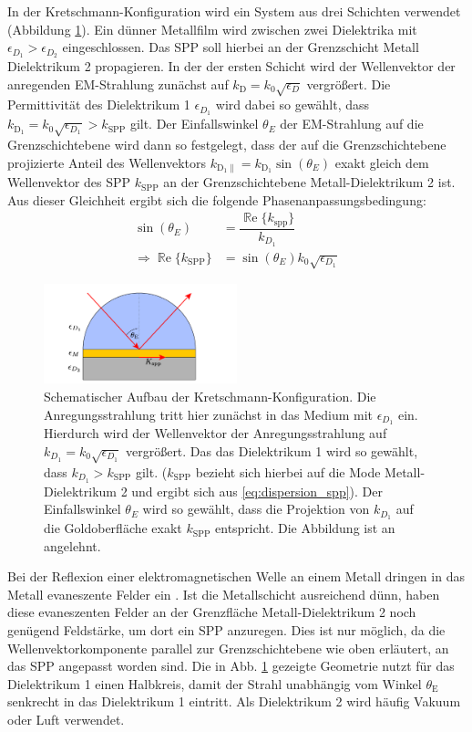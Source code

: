 \documentclass[titlepage,  ngerman]{article}
\renewcommand{\Re}{\operatorname{\mathbb{R}e}}
\begin{document}
	In der Kretschmann-Konfiguration wird ein System aus drei Schichten verwendet (Abbildung \ref{fig:kretschman}). Ein dünner Metallfilm wird zwischen zwei Dielektrika mit $\epsilon_{D_1} > \epsilon_{D_2}$ eingeschlossen. Das SPP soll hierbei an der Grenzschicht Metall Dielektrikum 2 propagieren. In der der ersten Schicht wird der Wellenvektor der anregenden EM-Strahlung zunächst auf $k_\mathrm{D} = k_0 \sqrt{\epsilon_D}$ vergrößert. Die Permittivität des Dielektrikum 1 $\epsilon_{D_1}$ wird dabei so gewählt, dass $k_\mathrm{D_1} = k_0 \sqrt{\epsilon_{D_1}} > k_\mathrm{SPP}$ gilt. Der Einfallswinkel $\theta_E$ der EM-Strahlung auf die Grenzschichtebene wird dann so festgelegt, dass der auf die Grenzschichtebene projizierte Anteil des Wellenvektors $k_{\mathrm{D_1}\parallel} = k_{\mathrm{D_1}} \sin(\theta_E)$ exakt gleich dem Wellenvektor des SPP $k_\mathrm{SPP}$ an der Grenzschichtebene Metall-Dielektrikum 2 ist. Aus dieser Gleichheit ergibt sich die folgende Phasenanpassungsbedingung: 
	\begin{align}
		\label{eq:phase_condition_kretschmann}
		\sin(\theta_E) &= \dfrac{\Re\{k_{\mathrm{spp}}\}}{k_{D_1}}\\
		\Rightarrow \Re\{k_{\mathrm{SPP}}\} &= \sin(\theta_E) k_0 \sqrt{\epsilon_{D_1}}
	\end{align}  
	\begin{figure}[h] 
		\centering
		\includegraphics[width=0.5\textwidth]{figures/Kretschmann.pdf}
		\caption[Kretschmann-Konfiguration]{Schematischer Aufbau der Kretschmann-Konfiguration. Die Anregungsstrahlung tritt hier zunächst in das Medium mit $\epsilon_{D_1}$ ein. Hierdurch wird der Wellenvektor der Anregungsstrahlung auf $k_{D_1}=k_0\sqrt{\epsilon_{D_1}}$ vergrößert. Das das Dielektrikum 1 wird so gewählt, dass $k_{D_1}> k_{\mathrm{SPP}}$ gilt. ($k_{\mathrm{SPP}}$ bezieht sich hierbei auf die Mode Metall-Dielektrikum 2 und ergibt sich aus \eqref{eq:dispersion_spp}). Der Einfallswinkel $\theta_E$ wird so gewählt, dass die Projektion von $k_{D_1}$ auf die Goldoberfläche exakt $k_{\mathrm{SPP}}$ entspricht. Die Abbildung ist an \cite{Jaruschewski.2020} angelehnt.}
		\label{fig:kretschman}
	\end{figure}
	Bei der Reflexion einer elektromagnetischen Welle an einem Metall dringen in das Metall evaneszente Felder ein \cite{Novotny.2012b}. Ist die Metallschicht ausreichend dünn, haben diese evaneszenten Felder an der Grenzfläche Metall-Dielektrikum 2 noch genügend Feldstärke, um dort ein SPP anzuregen. Dies ist nur möglich, da die Wellenvektorkomponente parallel zur Grenzschichtebene wie oben erläutert, an das SPP angepasst worden sind. Die in Abb. \ref{fig:kretschman} gezeigte Geometrie nutzt für das Dielektrikum 1 einen Halbkreis, damit der Strahl unabhängig vom Winkel $\theta_\mathrm{E}$ senkrecht in das Dielektrikum 1 eintritt. Als Dielektrikum 2 wird häufig Vakuum oder Luft verwendet.			
	
\end{document}
